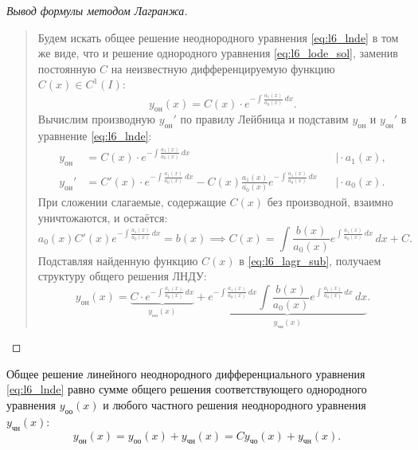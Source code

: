 \begin{proof}[Вывод формулы методом Лагранжа]~\\
    \begin{quote}
        Будем искать общее решение неоднородного уравнения \eqref{eq:l6_lnde}
        в том же виде, что и решение однородного уравнения
        \eqref{eq:l6_lode_sol}, заменив постоянную $C$ на неизвестную
        дифференцируемую функцию $C(x) \in C^1(I)$:
        \begin{equation} \label{eq:l6_lagr_sub}
            y_{\text{он}}(x) = C(x) \cdot e^{-\int \frac{a_1(x)}{a_0(x)} \, dx}.
            \tag{6}
        \end{equation}
        Вычислим производную $y_{\text{он}}'$ по правилу Лейбница и подставим
        $y_{\text{он}}$ и $y_{\text{он}}'$ в уравнение \eqref{eq:l6_lnde}:
        \begin{align*}
            y_{\text{он}} &= C(x) \cdot e^{-\int \frac{a_1(x)}{a_0(x)} \, dx}
            &&\Big| \cdot a_1(x), \\
            y_{\text{он}}' &= C'(x) \cdot e^{-\int \frac{a_1(x)}{a_0(x)} \, dx}
            - C(x) \frac{a_1(x)}{a_0(x)} e^{-\int \frac{a_1(x)}{a_0(x)} \, dx}
            &&\Big| \cdot a_0(x).
        \end{align*}
        При сложении слагаемые, содержащие $C(x)$ без производной, взаимно
        уничтожаются, и остаётся:
        \[
            a_0(x) C'(x) e^{-\int \frac{a_1(x)}{a_0(x)} \, dx} = b(x)
            \implies C(x) = \int \frac{b(x)}{a_0(x)}
            e^{\int \frac{a_1(x)}{a_0(x)} \, dx} \, dx + C.
        \]
        Подставляя найденную функцию $C(x)$ в \eqref{eq:l6_lagr_sub}, получаем
        структуру общего решения ЛНДУ:
        \begin{equation} \label{eq:l6_lnde_struct}
            y_{\text{он}}(x) =
            \underbrace{C \cdot e^{-\int \frac{a_1(x)}{a_0(x)} \, dx}}_{y_{\text{оо}}(x)}
            + \underbrace{e^{-\int \frac{a_1(x)}{a_0(x)} \, dx}
            \int \frac{b(x)}{a_0(x)} e^{\int \frac{a_1(x)}{a_0(x)} \, dx} \, dx}_{y_{\text{чн}}(x)}.
            \tag{7}
        \end{equation}
    \end{quote}
\end{proof}

\begin{theorem}
    Общее решение линейного неоднородного дифференциального уравнения
    \eqref{eq:l6_lnde} равно сумме общего решения соответствующего однородного
    уравнения $y_{\text{оо}}(x)$ и любого частного решения неоднородного
    уравнения $y_{\text{чн}}(x)$:
    \[
        y_{\text{он}}(x) = y_{\text{оо}}(x) + y_{\text{чн}}(x) =
        C y_{\text{чо}}(x) + y_{\text{чн}}(x).
    \]
\end{theorem}

